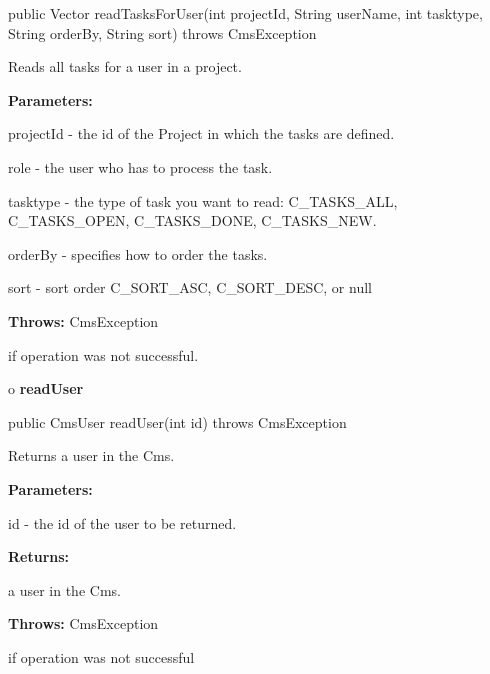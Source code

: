 \begin{PRE}
 public Vector readTasksForUser(int projectId,
                                String userName,
                                int tasktype,
                                String orderBy,
                                String sort) throws CmsException
\end{PRE}

\begin{description}
\htmlDD Reads all tasks for a user in a project. 

\begin{description}
\item {\bf Parameters:}  

projectId - the id of the Project in which the tasks are defined.  

role - the user who has to process the task.  

tasktype - the type of task you want to read: C\_TASKS\_ALL, C\_TASKS\_OPEN,
C\_TASKS\_DONE, C\_TASKS\_NEW.  

orderBy - specifies how to order the tasks.  

sort - sort order C\_SORT\_ASC, C\_SORT\_DESC, or null  
\item {\bf Throws:} CmsException  

if operation was not successful.  
\end{description}

\end{description}

o {\bf readUser} 

\begin{PRE}
 public CmsUser readUser(int id) throws CmsException
\end{PRE}

\begin{description}
\htmlDD Returns a user in the Cms. 

\begin{description}
\item {\bf Parameters:}  

id - the id of the user to be returned.  
\item {\bf Returns:}  

a user in the Cms.  
\item {\bf Throws:} CmsException  

if operation was not successful  
\end{description}

\end{description}

